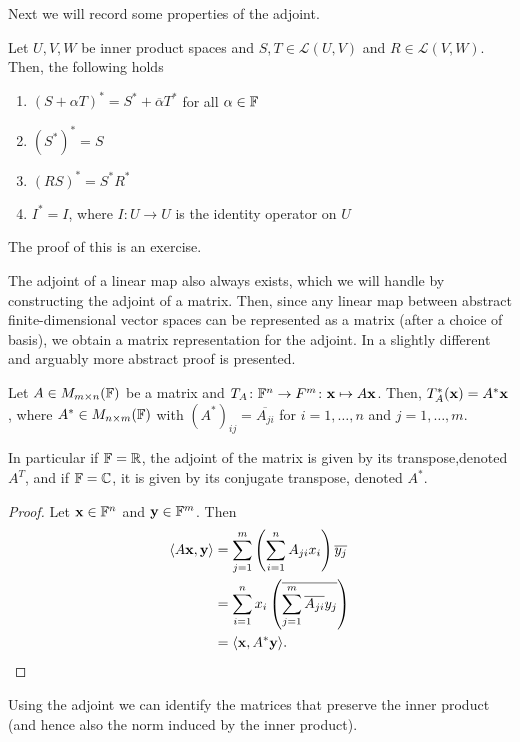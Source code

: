 \documentclass{article}
\begin{document}
Next we will record some properties of the adjoint.

\begin{proposition}
Let $U,V,W$ be inner product spaces and $S,T \in \mathcal{L}(U,V)$ and $R\in \mathcal{L}(V,W)$. Then, the following holds
\begin{enumerate}
    \item $(S+\alpha T)^* = S^* + \overline{\alpha}T^*$ for all $\alpha\in {\mathbb{F}}$
    \item $(S^*)^* = S$
    \item $(RS)^* = S^*R^*$
    \item $I^* = I$, where $I \colon U \to U$ is the identity operator on $U$
\end{enumerate}
\end{proposition}

The proof of this is an exercise. 

The adjoint of a linear map also always exists, which we will handle by constructing the adjoint of a matrix. Then, since any linear map between abstract finite-dimensional vector spaces can be represented as a matrix (after a choice of basis), we obtain a matrix representation for the adjoint.  In \cite{linalgright} a slightly different and arguably  more abstract proof is presented. 

\begin{proposition}
Let $A\in M_{m\times n}({\mathbb{F}})$ be a matrix and $T_A\colon {\mathbb{F}}^n\to F^m \colon {\mathbf{x}} \mapsto A{\mathbf{x}}$. Then, $T_A^*({\mathbf{x}}) = A^* {\mathbf{x}} $, where $A^*\in M_{n\times m}({\mathbb{F}})$ with $(A^*)_{ij} = \overline{A_{ji}}$ for $i=1,\ldots,n$ and $j=1,\ldots,m$. 

In particular if ${\mathbb{F}} = {\mathbb{R}}$, the adjoint of the matrix is given by its transpose,denoted $A^T$, and if ${\mathbb{F}} = {\mathbb{C}}$, it is given by its conjugate transpose, denoted $A^*$.
\end{proposition}

\begin{proof}
Let ${\mathbf{x}}\in {\mathbb{F}}^n$ and ${\mathbf{y}} \in {\mathbb{F}}^m$. Then
\begin{align*}
    \langle A{\mathbf{x}}, {\mathbf{y}} \rangle &= \sum_{j=1}^m \left(\sum_{i=1}^n A_{ji} x_i\right) \overline{y_j} \\
    &=\sum_{i=1}^n x_i \left( \overline{\sum_{j=1}^m \overline{A_{ji}} y_j}\right)\\
    &=\langle {\mathbf{x}}, A^* {\mathbf{y}} \rangle.
\end{align*}
\end{proof}

Using the adjoint we can identify the matrices that preserve the inner product (and hence also the norm induced by the inner product).
\end{document}
